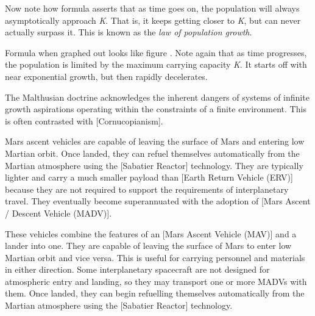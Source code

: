 Now note how formula  asserts that as time goes on, the population will always asymptotically approach {\it K}. That is, it keeps getting closer to {\it K}, but can never actually surpass it. This is known as the {\it law of population growth}.
\crlf

\startformula
{}
\stopformula
\crlf

Formula  when graphed out looks like figure . Note again that as time progresses, the population is limited by the maximum carrying capacity {\it K}. It starts off with near exponential growth, but then rapidly decelerates.

    {}

The Malthusian doctrine acknowledges the inherent dangers of systems of infinite growth aspirations operating within the constraints of a finite environment. This is often contrasted with [Cornucopianism].
\stopdefinition

Mars ascent vehicles are capable of leaving the surface of Mars and entering low Martian orbit. Once landed, they can refuel themselves automatically from the Martian atmosphere using the [Sabatier Reactor] technology. They are typically lighter and carry a much smaller payload than [Earth Return Vehicle (ERV)] because they are not required to support the requirements of interplanetary travel. They eventually become superannuated with the adoption of [Mars Ascent / Descent Vehicle (MADV)].
\stopdefinition

These vehicles combine the features of an [Mars Ascent Vehicle (MAV)] and a lander into one. They are capable of leaving the surface of Mars to enter low Martian orbit and vice versa. This is useful for carrying personnel and materials in either direction. Some interplanetary spacecraft are not designed for atmospheric entry and landing, so they may transport one or more MADVs with them. Once landed, they can begin refuelling themselves automatically from the Martian atmosphere using the [Sabatier Reactor] technology.
\stopdefinition

